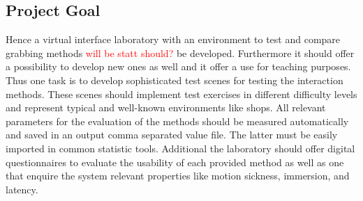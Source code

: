 \subsection{Project Goal}\label{sec:Project Goal}
Hence a virtual interface laboratory with an environment to test and compare grabbing methods \textcolor{red}{will be statt should?} be developed. Furthermore it should offer a possibility to develop new ones as well and it offer a use for teaching purposes. Thus one task is to develop sophisticated test scenes for testing the interaction methods. These scenes should implement test exercises in different difficulty levels and represent typical and well-known environments like shops. All relevant parameters for the evaluation of the methods should be measured automatically and saved in an output comma separated value file. The latter must be easily imported in common statistic tools. Additional the laboratory should offer digital questionnaires to evaluate the usability of each provided method as well as one that enquire the system relevant properties like motion sickness, immersion, and latency.

\newpage



















